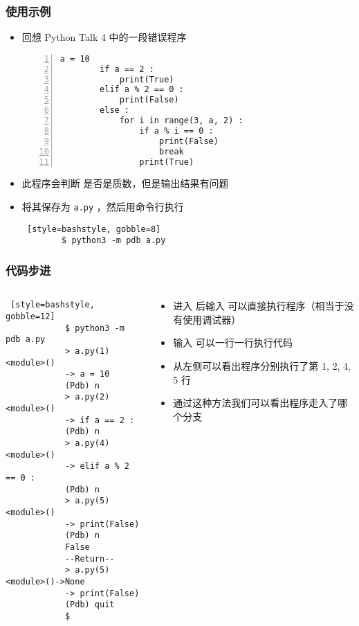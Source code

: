 \begin{frame} [fragile]
	\frametitle{使用示例}
	\begin{itemize}
	\item 回想 Python Talk 4 中的一段错误程序
		{\small
		\begin{lstlisting}[style=pythonstyle, gobble=8, frame=single, 
							numbers=left, numberstyle=\ttfamily]
		a = 10
		if a == 2 :
			print(True)
		elif a % 2 == 0 :
			print(False)
		else :
			for i in range(3, a, 2) :
				if a % i == 0 :
					print(False)
					break
				print(True)
		\end{lstlisting}
		}
	\item 此程序会判断  是否是质数，但是输出结果有问题
	\item 将其保存为 \texttt{a.py} ，然后用命令行执行
		\begin{lstlisting} [style=bashstyle, gobble=8]
		$ python3 -m pdb a.py
		\end{lstlisting}
	\end{itemize}
\end{frame}

\begin{frame} [fragile]
	\frametitle{代码步进}
	\begin{columns}[T]
		\begin{column}[T]{.5\textwidth}
			{\small
			\linespread{0.9}
			\begin{lstlisting} [style=bashstyle, gobble=12]
			$ python3 -m pdb a.py
			> a.py(1)<module>()
			-> a = 10
			(Pdb) n
			> a.py(2)<module>()
			-> if a == 2 :
			(Pdb) n
			> a.py(4)<module>()
			-> elif a % 2 == 0 :
			(Pdb) n
			> a.py(5)<module>()
			-> print(False)
			(Pdb) n
			False
			--Return--
			> a.py(5)<module>()->None
			-> print(False)
			(Pdb) quit
			$ 
			\end{lstlisting}
			}
		\end{column}
		\begin{column}[T]{.5\textwidth}
			\linespread{1.5}
			\begin{itemize}
			\item 进入  后输入 
					可以直接执行程序（相当于没有使用调试器）
			\item 输入  可以一行一行执行代码
			\item 从左侧可以看出程序分别执行了第 1, 2, 4, 5 行
			\item 通过这种方法我们可以看出程序走入了哪个分支
			\end{itemize}
		\end{column}
	\end{columns}
\end{frame}

